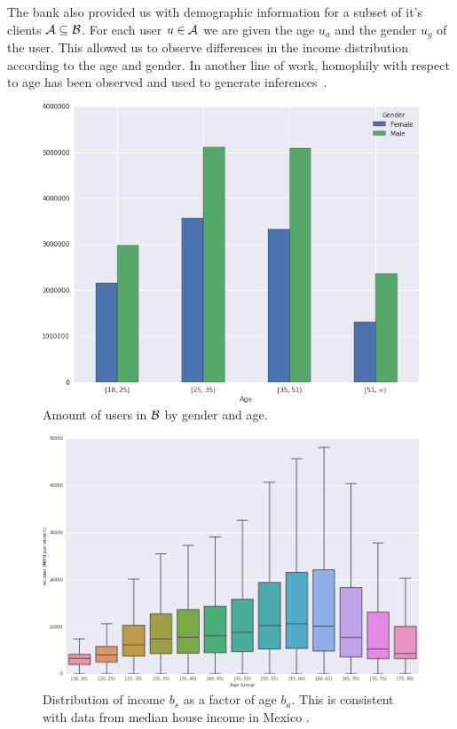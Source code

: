 The bank also provided us with demographic information for a subset of it's clients \( \mathcal{A} \subseteq \mathcal{B} \). For each user \( u \in \mathcal{A} \) we are given  the age \( u_a \) and the gender \( u_g \) of the user. This allowed us to observe differences in the income distribution according to the age and gender. In another line of work, homophily with respect to age has been observed and used to generate inferences~\cite{brea2014}.

\begin{figure}[h]
\begin{center}
\includegraphics[width=0.8\columnwidth]{figures/gender_age_bar3/gender_age_bar3.png}
\caption{ Amount of users in \( \mathcal{B} \) by gender and age. }
\label{gender_age_bar}
\end{center}
\end{figure}

\vspace{-1em}

\begin{figure}[h]
\begin{center}
\includegraphics[width=0.95\columnwidth]{figures/income_age_boxplot4/income_age_boxplot4.png}
\caption{ Distribution of income $ b_s $ as a factor of age $ b_a $. This is consistent with data from median house income in Mexico \cite{gallup2013}. }
\label{income_age_boxplot}
\end{center}
\end{figure}


